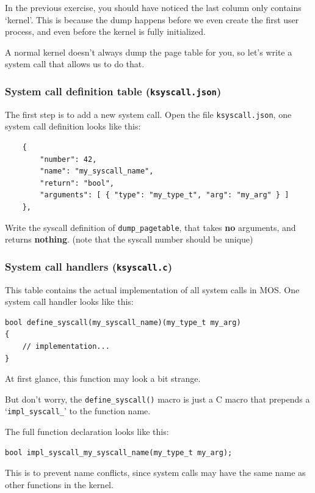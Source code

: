 In the previous exercise, you should have noticed the last column only contains
`kernel'. This is because the dump happens before we even create the first user
process, and even before the kernel is fully initialized.

A normal kernel doesn't always dump the page table for you, so let's write a
system call that allows us to do that.

\subsubsection{System call definition table (\texttt{ksyscall.json})}

The first step is to add a new system call. Open the file \texttt{ksyscall.json},
one system call definition looks like this:

\begin{verbatim}
    {
        "number": 42,
        "name": "my_syscall_name",
        "return": "bool",
        "arguments": [ { "type": "my_type_t", "arg": "my_arg" } ]
    },
\end{verbatim}

\begin{exercise}
    \item Write the syscall definition of \texttt{dump\_pagetable}, that takes
    \textbf{no} arguments, and returns \textbf{nothing}. (note that the syscall
    number should be unique)
\end{exercise}

\subsubsection{System call handlers (\texttt{ksyscall.c})}

This table contains the actual implementation of all system calls in MOS. One
system call handler looks like this:

\begin{verbatim}
bool define_syscall(my_syscall_name)(my_type_t my_arg)
{
    // implementation...
}
\end{verbatim}

\begin{note}
    \item At first glance, this function may look a bit strange.

    \item But don't worry, the \texttt{define\_syscall()} macro is just a
    C macro that prepends a `\texttt{impl\_syscall\_}' to the function name.

    The full function declaration looks like this:

    \begin{verbatim}
bool impl_syscall_my_syscall_name(my_type_t my_arg);
    \end{verbatim}

    \item This is to prevent name conflicts, since system calls may have the same
    name as other functions in the kernel.
\end{note}

